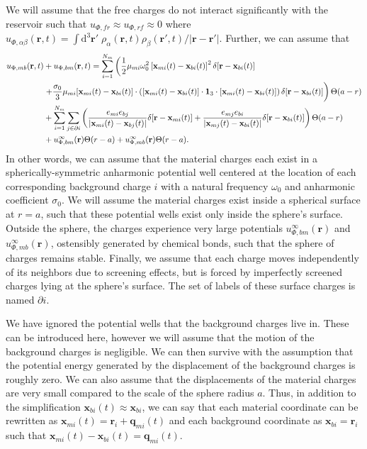 \documentclass{article}
\begin{document}
We will assume that the free charges do not interact significantly with the reservoir such that $u_{\Phi,fr} \approx u_{\Phi,rf} \approx 0$ where $u_{\Phi,\alpha\beta}(\mathbf{r},t) = \int\mathrm{d}^3\mathbf{r}'\;\rho_\alpha(\mathbf{r},t)\rho_\beta(\mathbf{r}',t)/|\mathbf{r} - \mathbf{r}'|$. Further, we can assume that
\begin{equation}\label{eq:uPhiBM}
\begin{split}
u_{\Phi,mb}(\mathbf{r},t) &+ u_{\Phi,bm}(\mathbf{r},t) = \sum_{i = 1}^{N_m}\left(\frac{1}{2}\mu_{mi}\omega_0^2\left[\mathbf{x}_{mi}(t) - \mathbf{x}_{bi}(t)\right]^2\delta[\mathbf{r} - \mathbf{x}_{bi}(t)]\right.\\
&\left.+ \frac{\sigma_0}{3}\mu_{mi}[\mathbf{x}_{mi}(t) - \mathbf{x}_{bi}(t)]\cdot\left([\mathbf{x}_{mi}(t) - \mathbf{x}_{bi}(t)]\cdot\bm{1}_3\cdot[\mathbf{x}_{mi}(t) - \mathbf{x}_{bi}(t)]\right)\delta[\mathbf{r} - \mathbf{x}_{bi}(t)] \vphantom{\frac{1}{2}} \right)\Theta(a - r)\\
&+ \sum_{i = 1}^{N_m}\sum_{j\in\partial i}\left(\frac{e_{mi}e_{bj}}{|\mathbf{x}_{mi}(t) - \mathbf{x}_{bj}(t)|}\delta[\mathbf{r} - \mathbf{x}_{mi}(t)] + \frac{e_{mj}e_{bi}}{|\mathbf{x}_{mj}(t) - \mathbf{x}_{bi}(t)|}\delta[\mathbf{r} - \mathbf{x}_{bi}(t)]\right)\Theta(a - r)\\
&+ u_{\Phi,bm}^\infty(\mathbf{r})\Theta(r - a) + u_{\Phi,mb}^\infty(\mathbf{r})\Theta(r - a) .
\end{split}
\end{equation}
In other words, we can assume that the material charges each exist in a spherically-symmetric anharmonic potential well centered at the location of each corresponding background charge $i$ with a natural frequency $\omega_0$ and anharmonic coefficient $\sigma_0$. We will assume the material charges exist inside a spherical surface at $r = a$, such that these potential wells exist only inside the sphere's surface. Outside the sphere, the charges experience very large potentials $u_{\Phi,bm}^\infty(\mathbf{r})$ and $u_{\Phi,mb}^\infty(\mathbf{r})$, ostensibly generated by chemical bonds, such that the sphere of charges remains stable. Finally, we assume that each charge moves independently of its neighbors due to screening effects, but is forced by imperfectly screened charges lying at the sphere's surface. The set of labels of these surface charges is named $\partial i$.

We have ignored the potential wells that the background charges live in. These can be introduced here, however we will assume that the motion of the background charges is negligible. We can then survive with the assumption that the potential energy generated by the displacement of the background charges is roughly zero. We can also assume that the displacements of the material charges are very small compared to the scale of the sphere radius $a$. Thus, in addition to the simplification $\mathbf{x}_{bi}(t)\approx\mathbf{x}_{bi}$, we can say that each material coordinate can be rewritten as $\mathbf{x}_{mi}(t) = \mathbf{r}_i + \mathbf{q}_{mi}(t)$ and each background coordinate as $\mathbf{x}_{bi} = \mathbf{r}_i$ such that $\mathbf{x}_{mi}(t) - \mathbf{x}_{bi}(t) = \mathbf{q}_{mi}(t)$. 
\end{document}
